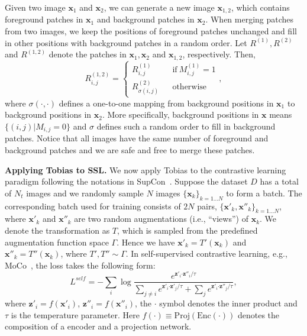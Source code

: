 \documentclass[letterpaper]{article} %
\begin{document}
Given two image $\boldsymbol{x}_1$ and $\boldsymbol{x}_2$, we can generate a new image $\boldsymbol{x}_{1,2}$, which contains foreground patches in $\boldsymbol{x}_1$ and background patches in $\boldsymbol{x}_2$. When merging patches from two images, we keep the positions of foreground patches unchanged and fill in other positions with background patches in a random order. Let $R^{(1)},R^{(2)}$ and $R^{(1,2)}$ denote the patches in $\boldsymbol{x}_1, \boldsymbol{x}_2$ and $\boldsymbol{x}_{1,2}$, respectively. Then,
\begin{equation}
	\label{Tk}
	R^{(1,2)}_{i,j} = \left\{
	\begin{array}{rcl}
		R^{(1)}_{i,j}\phantom{0} &  & \text{if} \  M^{(1)}_{i,j}=1\\
		R^{(2)}_{\sigma(i,j)} && {\text{otherwise}}
	\end{array} \right. ,
\end{equation}
where $\sigma(\cdot,\cdot)$ defines a one-to-one mapping from background positions in $\boldsymbol{x}_1$ to background positions in $\boldsymbol{x}_2$. More specifically, background positions in $\boldsymbol{x}$ means $\{(i,j)|M_{i,j}=0\}$ and $\sigma$ defines such a random order to fill in background patches. Notice that all images have the same number of foreground and background patches and we are safe and free to merge these patches.

\textbf{Applying Tobias to SSL.} We now apply Tobias to the contrastive learning paradigm following the notations in SupCon~\citep{supcon:khosla:nips20}. Suppose the dataset $D$ has a total of $N_t$ images and we randomly sample $N$ images $\{\boldsymbol{x}_k\}_{k=1\dots{N}}$ to form a batch. The corresponding batch used for training consists of $2N$ pairs, $\{\boldsymbol{x}'_k,\boldsymbol{x}''_k\}_{k=1\dots{N}}$, where $\boldsymbol{x}'_{k}$ and $\boldsymbol{x}''_{k}$ are two random augmentations (i.e., ``views'') of $\boldsymbol{x}_{k}$. We denote the transformation as $T$, which is sampled from the predefined augmentation function space $\Gamma$. Hence we have $\boldsymbol{x}'_{k}=T'(\boldsymbol{x}_k)$ and $\boldsymbol{x}''_{k}=T''(\boldsymbol{x}_k)$, where $T',T''\sim\Gamma$. In self-supervised contrastive learning, e.g., MoCo~\citep{moco:kaiming:CVPR20}, the loss takes the following form:
\begin{equation}
	L^{self}=-\sum_{i} \log \frac{e^{\boldsymbol{z}'_i\boldsymbol{\cdot}\boldsymbol{z}''_i/\tau}}{\sum_{j\neq i} e^{\boldsymbol{z}'_i\boldsymbol{\cdot} \boldsymbol{z}'_j/\tau}+\sum_{j} e^{\boldsymbol{z}'_i\boldsymbol{\cdot} \boldsymbol{z}''_j/\tau}},
\end{equation}
where $\boldsymbol{z}'_i=f(\boldsymbol{x}'_i)$, $\boldsymbol{z}''_i=f(\boldsymbol{x}''_i)$, the $\boldsymbol{\cdot}$ symbol denotes the inner product and $\tau$ is the temperature parameter. Here $f(\cdot)\equiv\text{Proj}(\text{Enc}(\cdot))$ denotes the composition of a encoder and a projection network.
\end{document}
